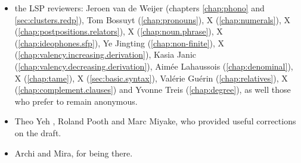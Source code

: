 \begin{itemize}
	\item the LSP reviewers: Jeroen van de Weijer (chapters \ref{chap:phono} and \ref{sec:clusters.redp}), Tom Bossuyt (\ref{chap:pronouns}), X (\ref{chap:numerals}), X (\ref{chap:postpositions.relators}), X (\ref{chap:noun.phrase}), X (\ref{chap:ideophones.sfp}), Ye Jingting  (\ref{chap:non-finite}), X (\ref{chap:valency.increasing.derivation}), Kasia Janic (\ref{chap:valency.decreasing.derivation}), Aimée Lahaussois (\ref{chap:denominal}), X (\ref{chap:tame}), X (\ref{sec:basic.syntax}), Valérie Guérin (\ref{chap:relatives}), X (\ref{chap:complement.clauses}) and Yvonne Treis (\ref{chap:degree}), as well those who prefer to remain anonymous.
	\item Theo Yeh , Roland Pooth and Marc Miyake, who provided useful corrections on the draft.
	\item Archi and Mira, for being there.
\end{itemize}
